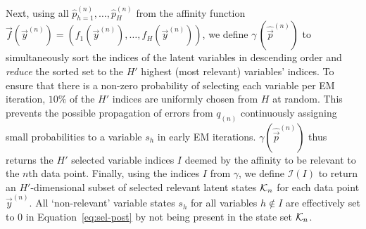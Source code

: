 %
Next, using all $\hat{p}_{h=1}^{(n)},\dots, \hat{p}_H^{(n)}$  
from the affinity function 
$\vec{f}(\vec{y}^{(n)}) = (f_1(\vec{y}^{(n)}), \dots, f_H(\vec{y}^{(n)}))$, we define 
 $\gamma\,(\hat{\vec{p}}^{(n)})$ to simultaneously sort the indices of the latent variables in descending order and \textit{reduce} the sorted set to the $H'$ highest (most relevant) variables' indices. %
To ensure that there is a non-zero probability of selecting each variable per EM iteration, $10\%$ of the $H'$ indices are uniformly chosen from $H$ at random. 
This prevents the possible propagation of errors from $q_{(n)}$ continuously assigning small probabilities to a variable $s_h$ in early EM
iterations. 
$\gamma(\hat{\vec{p}}^{(n)})$ thus returns the $H'$ selected variable indices $I$ deemed by the affinity to be relevant to the $n$th data point.
%
%
%
Finally, using the indices $I$ from $\gamma$, we define $\mathcal{I}(I)$ to return an 
$H'$-dimensional subset of selected relevant latent states $\mathcal{K}_{n}$ for each data point $\vec{y}^{(n)}$. 
%
All `non-relevant' variable states $s_h$ for all variables $h\not\in I$ are effectively set to $0$ in Equation~\eqref{eq:sel-post} 
by not being present in the state set $\mathcal{K}_{n}$.
%
%

